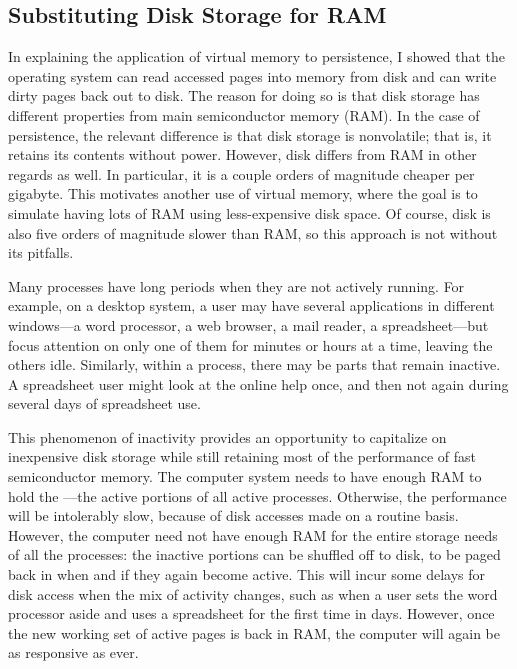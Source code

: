 \subsection{Substituting Disk Storage for RAM}
\label{disk-for-RAM}
In explaining the application of virtual memory to persistence, I
showed that the operating system can read accessed pages into memory
from disk and can write dirty pages back out to disk.  The reason for
doing so is that disk storage has different properties from main
semiconductor memory (RAM).  In the case of persistence, the relevant
difference is that disk storage is nonvolatile; that is, it retains its
contents without power.  However, disk differs from RAM in other
regards as well.  In particular, it is a couple orders of magnitude
cheaper per gigabyte.  This motivates another use of virtual memory,
where the goal is to simulate having lots of RAM using less-expensive
disk space.  Of course, disk is also five orders of magnitude slower
than RAM, so this approach is not without its pitfalls.

Many processes have long periods when they are not actively running.
For example, on a desktop system, a user may have several applications
in different windows---a word processor, a web browser, a mail reader,
a spreadsheet---but focus attention on only one of them for minutes or
hours at a time, leaving the others idle.  Similarly, within a
process, there may be parts that remain inactive.  A spreadsheet user
might look at the online help once, and then not again during several
days of spreadsheet use.

This phenomenon of inactivity provides an opportunity to capitalize on
inexpensive disk storage while still retaining most of the
performance of fast semiconductor memory.  The computer system needs
to have enough RAM to hold the ---the active
portions of all active processes.  Otherwise, the performance will be
intolerably slow, because of disk accesses made on a routine basis.  However,
the computer need not have enough RAM for the entire storage needs of
all the processes: the inactive portions can be shuffled off to disk,
to be paged back in when and if they again become active.  This will
incur some delays for disk access when the mix of activity changes,
such as when a user sets the word processor aside and uses a spreadsheet
for the first time in days.  However, once the new working set of
active pages is back in RAM, the computer will again be as responsive
as ever.

